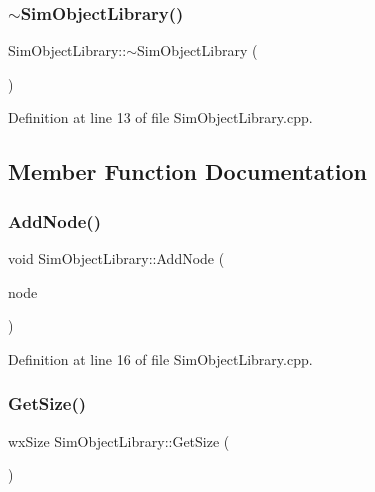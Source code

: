 \mbox{\label{class_sim_object_library_acb3952bfbbb6ad77f8ce34883aa4a23d}} 
\subsubsection{\texorpdfstring{$\sim$\+Sim\+Object\+Library()}{~SimObjectLibrary()}}
{\footnotesize\ttfamily Sim\+Object\+Library\+::$\sim$\+Sim\+Object\+Library (\begin{DoxyParamCaption}{ }\end{DoxyParamCaption})}



Definition at line 13 of file Sim\+Object\+Library.\+cpp.



\subsection{Member Function Documentation}
\mbox{\label{class_sim_object_library_a7e99f1b55ecf5e894a8b83228bc74b0e}} 
\subsubsection{\texorpdfstring{Add\+Node()}{AddNode()}}
{\footnotesize\ttfamily void Sim\+Object\+Library\+::\+Add\+Node (\begin{DoxyParamCaption}\item[{\hyperlink{class_graphical_node}{Graphical\+Node} $\ast$}]{node }\end{DoxyParamCaption})}



Definition at line 16 of file Sim\+Object\+Library.\+cpp.

\mbox{\label{class_sim_object_library_af66daff6ed6fcecb0509e47a97847986}} 
\subsubsection{\texorpdfstring{Get\+Size()}{GetSize()}}
{\footnotesize\ttfamily wx\+Size Sim\+Object\+Library\+::\+Get\+Size (\begin{DoxyParamCaption}{ }\end{DoxyParamCaption})\hspace{0.3cm}{\ttfamily [inline]}}



